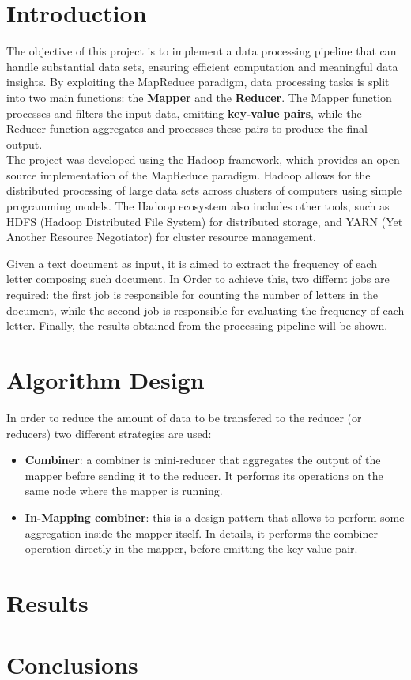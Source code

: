 \documentclass[a4paper, 12pt]{article}
\begin{document}


\tableofcontents
\newpage
\section{Introduction}
The objective of this project is to implement a data processing pipeline that can handle substantial data sets, ensuring efficient computation and meaningful data insights. By exploiting the MapReduce paradigm, data processing tasks is split into two main functions: the \textbf{Mapper} and the \textbf{Reducer}.\newline
The Mapper function processes and filters the input data, emitting \textbf{key-value pairs}, while the Reducer function aggregates and processes these pairs to produce the final output.\\

\noindent The project was developed using the Hadoop framework, which provides an open-source implementation of the MapReduce paradigm. Hadoop allows for the distributed processing of large data sets across clusters of computers using simple programming models. The Hadoop ecosystem also includes other tools, such as HDFS (Hadoop Distributed File System) for distributed storage, and YARN (Yet Another Resource Negotiator) for cluster resource management.\newline

\noindent Given a text document as input, it is aimed to extract the frequency of each letter composing such document. In Order to achieve this, two differnt jobs are required: the first job is responsible for counting the number of letters in the document, while the second job is responsible for evaluating the frequency of each letter. Finally, the results obtained from the processing pipeline will be shown.



\section{Algorithm Design}
In order to reduce the amount of data to be transfered to the reducer (or reducers) two different strategies are used:
\begin{itemize}
  \item \textbf{Combiner}: a combiner is mini-reducer that aggregates the output of the mapper before sending it to the reducer. It performs its operations on the same node where the mapper is running.
  \item \textbf{In-Mapping combiner}: this is a design pattern that allows to perform some aggregation inside the mapper itself. In details, it performs the combiner operation directly in the mapper, before emitting the key-value pair.
\end{itemize}

\section{Results}


\section{Conclusions}
\end{document}
